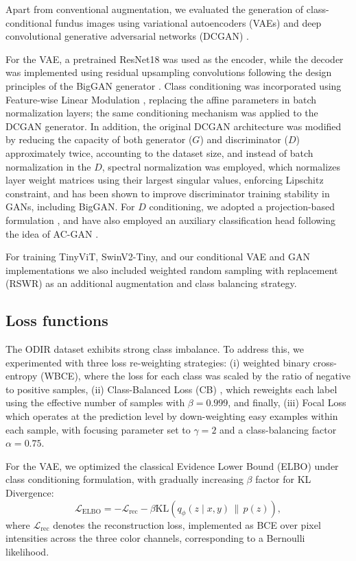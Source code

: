 \documentclass{article}
\begin{document}
Apart from conventional augmentation, we evaluated the generation of class-conditional fundus images using variational autoencoders (VAEs) \cite{Kingma2013VAE} and deep convolutional generative adversarial networks (DCGAN) \cite{Radford2015DCGAN}.

For the VAE, a pretrained ResNet18 was used as the encoder, while the decoder was implemented using residual upsampling convolutions following the design principles of the BigGAN generator \cite{Brock2018BigGAN}. Class conditioning was incorporated using Feature-wise Linear Modulation \cite{Perez2018FiLM}, replacing the affine parameters in batch normalization layers; the same conditioning mechanism was applied to the DCGAN generator. In addition, the original DCGAN architecture was modified by reducing the capacity of both generator ($G$) and discriminator ($D$) approximately twice, accounting to the dataset size, and instead of batch normalization in the $D$, spectral normalization was employed, which normalizes layer weight matrices using their largest singular values, enforcing Lipschitz constraint, and has been shown to improve discriminator training stability in GANs, including BigGAN. For $D$ conditioning, we adopted a projection-based formulation \cite{Miyato2018ProjectionDiscriminatorArXiv}, and have also employed an auxiliary classification head following the idea of AC-GAN \cite{Odena2016ACGANArXiv}.

For training TinyViT, SwinV2-Tiny, and our conditional VAE and GAN implementations we also included weighted random sampling with replacement (RSWR) as an additional augmentation and class balancing strategy.

\subsection{Loss functions}
\label{sec:losses}
The ODIR dataset exhibits strong class imbalance. To address this, we experimented with three loss re-weighting strategies: 
(i) weighted binary cross-entropy (WBCE), where the loss for each class was scaled by the ratio of negative to positive samples, (ii) Class-Balanced Loss (CB) \cite{cui2019class}, which reweights each label using the effective number of samples with $\beta=0.999$, and finally, (iii) Focal Loss \cite{lin2017focal} which operates at the prediction level by down-weighting easy examples within each sample, with focusing parameter set to $\gamma=2$ and a class-balancing factor $\alpha=0.75$.

For the VAE, we optimized the classical Evidence Lower Bound (ELBO) under class conditioning formulation, with gradually increasing $\beta$ factor for KL Divergence:
\begin{equation}
\mathcal{L}_{\text{ELBO}}
=
-\mathcal{L}_{\text{rec}}
-
\beta\mathrm{KL}\!\left(q_\phi(z\mid x,y)\,\|\,p(z)\right),
\end{equation}
where $\mathcal{L}_{\text{rec}}$ denotes the reconstruction loss, implemented as BCE over pixel intensities across the three color channels, corresponding to a Bernoulli likelihood.
\end{document}
